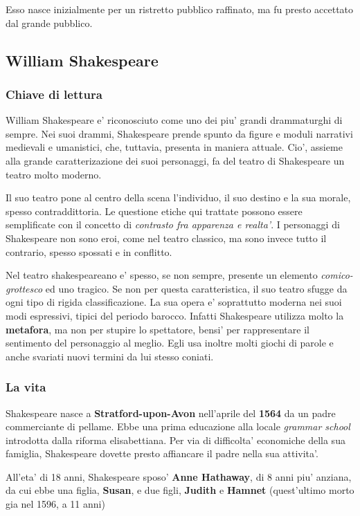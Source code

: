 \documentclass{article}
\begin{document}
{{    Esso nasce inizialmente per un ristretto pubblico raffinato, ma fu presto accettato dal grande pubblico.
  }

  \subsection{William Shakespeare}
  {
    \subsubsection{Chiave di lettura} %
    William Shakespeare e' riconosciuto come uno dei piu' grandi drammaturghi di sempre. Nei suoi drammi, Shakespeare prende spunto da figure e moduli narrativi medievali e umanistici, che, tuttavia, presenta in maniera attuale. Cio', assieme alla grande caratterizazione dei suoi personaggi, fa del teatro di Shakespeare un teatro molto moderno.

    Il suo teatro pone al centro della scena l'individuo, il suo destino e la sua morale, spesso contraddittoria. Le questione etiche qui trattate possono essere semplificate con il concetto di \textit{contrasto fra apparenza e realta'}. I personaggi di Shakespeare non sono eroi, come nel teatro classico, ma sono invece tutto il contrario, spesso spossati e in conflitto.

    Nel teatro shakespeareano e' spesso, se non sempre, presente un elemento \textit{comico-grottesco} ed uno tragico. Se non per questa caratteristica, il suo teatro sfugge da ogni tipo di rigida classificazione. La sua opera e' soprattutto moderna nei suoi modi espressivi, tipici del periodo barocco. Infatti Shakespeare utilizza molto la \textbf{metafora}, ma non per stupire lo spettatore, bensi' per rappresentare il sentimento del personaggio al meglio. Egli usa inoltre molti giochi di parole e anche svariati nuovi termini da lui stesso coniati.

    \subsubsection{La vita} %
    Shakespeare nasce a \textbf{Stratford-upon-Avon} nell'aprile del \textbf{1564} da un padre commerciante di pellame. Ebbe una prima educazione alla locale \textit{grammar school} introdotta dalla riforma elisabettiana. Per via di difficolta' economiche della sua famiglia, Shakespeare dovette presto affiancare il padre nella sua attivita'.

    All'eta' di 18 anni, Shakespeare sposo' \textbf{Anne Hathaway}, di 8 anni piu' anziana, da cui ebbe una figlia, \textbf{Susan}, e due figli, \textbf{Judith} e \textbf{Hamnet} \small{(quest'ultimo morto gia nel 1596, a 11 anni)}

}}
\end{document}
